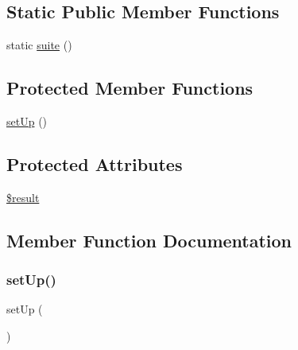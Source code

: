 \subsection*{Static Public Member Functions}
\begin{DoxyCompactItemize}
\item 
static \mbox{\hyperlink{class_framework___suite_test_ae613daa28fb6b747c1940f6c9becccf7}{suite}} ()
\end{DoxyCompactItemize}
\subsection*{Protected Member Functions}
\begin{DoxyCompactItemize}
\item 
\mbox{\hyperlink{class_framework___suite_test_a0bc688732d2b3b162ffebaf7812e78da}{set\+Up}} ()
\end{DoxyCompactItemize}
\subsection*{Protected Attributes}
\begin{DoxyCompactItemize}
\item 
\mbox{\hyperlink{class_framework___suite_test_a112ef069ddc0454086e3d1e6d8d55d07}{\$result}}
\end{DoxyCompactItemize}


\subsection{Member Function Documentation}
\mbox{\label{class_framework___suite_test_a0bc688732d2b3b162ffebaf7812e78da}} 
\subsubsection{\texorpdfstring{set\+Up()}{setUp()}}
{\footnotesize\ttfamily set\+Up (\begin{DoxyParamCaption}{ }\end{DoxyParamCaption})\hspace{0.3cm}{\ttfamily [protected]}}

\mbox{\label{class_framework___suite_test_ae613daa28fb6b747c1940f6c9becccf7}} 
